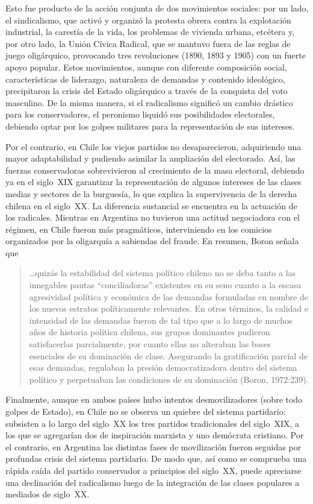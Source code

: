 Esto fue producto de la acción conjunta de dos movimientos sociales: por un lado, el sindicalismo, que activó y organizó la protesta obrera contra la explotación industrial, la carestía de la vida, los problemas de vivienda urbana, etcétera y, por otro lado, la Unión Cívica Radical, que se mantuvo fuera de las reglas de juego oligárquico, provocando tres revoluciones (1890, 1893 y 1905) con un fuerte apoyo popular. Estos movimientos, aunque con diferente composición social, características de liderazgo, naturaleza de demandas y contenido ideológico, precipitaron la crisis del Estado oligárquico a través de la conquista del voto masculino. De la misma manera, si el radicalismo significó un cambio drástico para los conservadores, el peronismo liquidó sus posibilidades electorales, debiendo optar por los golpes militares para la representación de sus intereses.

Por el contrario, en Chile los viejos partidos no desaparecieron, adquiriendo una mayor adaptabilidad y pudiendo asimilar la ampliación del electorado. Así, las fuerzas conservadoras sobrevivieron al crecimiento de la masa electoral, debiendo ya en el siglo~XIX garantizar la representación de algunos intereses de las clases medias y sectores de la burguesía, lo que explica la supervivencia de la derecha chilena en el siglo~XX. La diferencia sustancial se encuentra en la actuación de los radicales. Mientras en Argentina no tuvieron una actitud negociadora con el régimen, en Chile fueron más pragmáticos, interviniendo en los comicios organizados por la oligarquía a sabiendas del fraude. En resumen, Boron señala que

\begin{quote}
\ldots quizás la estabilidad del sistema político chileno no se deba tanto a las innegables pautas ``conciliadoras'' existentes en su seno cuanto a la escasa agresividad política y económica de las demandas formuladas en nombre de los nuevos estratos políticamente relevantes. En otros términos, la calidad e intensidad de las demandas fueron de tal tipo que a lo largo de muchos años de historia política chilena, sus grupos dominantes pudieron satisfacerlas parcialmente, por cuanto ellas no alteraban las bases esenciales de su dominación de clase. Asegurando la gratificación parcial de esas demandas, regulaban la presión democratizadora dentro del sistema político y perpetuaban las condiciones de su dominación (Boron, 1972:239).
\end{quote}

Finalmente, aunque en ambos países hubo intentos desmovilizadores (sobre todo golpes de Estado), en Chile no se observa un quiebre del sistema partidario: subsisten a lo largo del siglo~XX los tres partidos tradicionales del siglo~XIX, a los que se agregarían dos de inspiración marxista y uno demócrata cristiano. Por el contrario, en Argentina las distintas fases de movilización fueron seguidas por profundas crisis del sistema partidario. De modo que, así como se comprueba una rápida caída del partido conservador a principios del siglo~XX, puede apreciarse una declinación del radicalismo luego de la integración de las clases populares a mediados de siglo~XX.

